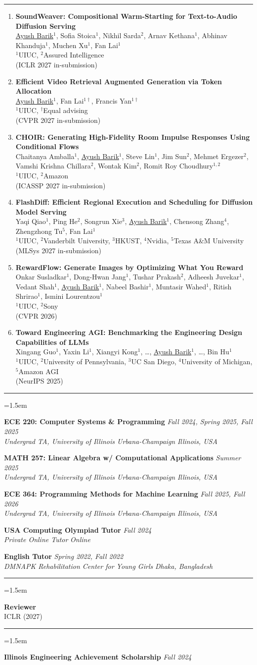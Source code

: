 \documentclass[11pt,letterpaper]{article}
\newcommand{\rsection}[1]{\vspace{7pt}{\bfseries\scshape #1}\par\vspace{-6pt}\rule{\linewidth}{0.6pt}\par\vspace{2pt}}
\newenvironment{rblock}{\begin{list}{}{\leftmargin=1.5em\itemsep=8pt\topsep=2pt}}{\end{list}}
\newcommand{\entry}[4]{\item \textbf{#1} \hfill \textit{#2}\\ \textit{#3} \hfill \textit{#4}}
\newcommand{\me}{\uline{Ayush Barik}}
\newcommand{\pub}[4]{\item \textbf{#1}\\ #2\\ #3\\ #4}
\begin{document}
\rsection{Research}
\begin{enumerate}[leftmargin=1.5em,itemsep=4pt,topsep=3pt]
\pub{SoundWeaver: Compositional Warm-Starting for Text-to-Audio Diffusion Serving}
  {\me$^1$, Sofia Stoica$^1$, Nikhil Sarda$^2$, Arnav Kethana$^1$, Abhinav Khanduja$^1$, Muchen Xu$^1$, Fan Lai$^1$}
  {$^1$UIUC, $^2$Assured Intelligence}{(ICLR 2027 in-submission)}
\pub{Efficient Video Retrieval Augmented Generation via Token Allocation}
  {\me$^1$, Fan Lai$^{1\dagger}$, Francis Yan$^{1\dagger}$}{$^1$UIUC, $^\dagger$Equal advising}{(CVPR 2027 in-submission)}
\pub{CHOIR: Generating High-Fidelity Room Impulse Responses Using Conditional Flows}
  {Chaitanya Amballa$^1$, \me$^1$, Steve Lin$^1$, Jim Sun$^2$, Mehmet Ergezer$^2$, Vamshi Krishna Chillara$^2$, Wontak Kim$^2$, Romit Roy Choudhury$^{1,2}$}
  {$^1$UIUC, $^2$Amazon}{(ICASSP 2027 in-submission)}
\pub{FlashDiff: Efficient Regional Execution and Scheduling for Diffusion Model Serving}
  {Yaqi Qiao$^1$, Ping He$^2$, Songrun Xie$^3$, \me$^1$, Chensong Zhang$^4$, Zhengzhong Tu$^5$, Fan Lai$^1$}
  {$^1$UIUC, $^2$Vanderbilt University, $^3$HKUST, $^4$Nvidia, $^5$Texas A\&M University}{(MLSys 2027 in-submission)}
\pub{RewardFlow: Generate Images by Optimizing What You Reward}
  {Onkar Susladkar$^1$, Dong-Hwan Jang$^1$, Tushar Prakash$^2$, Adheesh Juvekar$^1$, Vedant Shah$^1$, \me$^1$, Nabeel Bashir$^1$, Muntasir Wahed$^1$, Ritish Shrirao$^1$, Ismini Lourentzou$^1$}
  {$^1$UIUC, $^2$Sony}{(CVPR 2026)}
\pub{Toward Engineering AGI: Benchmarking the Engineering Design Capabilities of LLMs}
  {Xingang Guo$^1$, Yaxin Li$^1$, Xiangyi Kong$^1$, \dots, \me$^1$, \dots, Bin Hu$^1$}
  {$^1$UIUC, $^2$University of Pennsylvania, $^3$UC San Diego, $^4$University of Michigan, $^5$Amazon AGI}{(NeurIPS 2025)}
\end{enumerate}

\newpage
\rsection{Teaching}
\begin{rblock}
  \entry{ECE 220: Computer Systems \& Programming}{Fall 2024, Spring 2025, Fall 2025}{Undergrad TA, University of Illinois Urbana-Champaign}{Illinois, USA}
  \entry{MATH 257: Linear Algebra w/ Computational Applications}{Summer 2025}{Undergrad TA, University of Illinois Urbana-Champaign}{Illinois, USA}
  \entry{ECE 364: Programming Methods for Machine Learning}{Fall 2025, Fall 2026}{Undergrad TA, University of Illinois Urbana-Champaign}{Illinois, USA}
  \entry{USA Computing Olympiad Tutor}{Fall 2024}{Private Online Tutor}{Online}
  \entry{English Tutor}{Spring 2022, Fall 2022}{DMNAPK Rehabilitation Center for Young Girls}{Dhaka, Bangladesh}
\end{rblock}

\rsection{Service}
\begin{rblock}
  \item \textbf{Reviewer}\\ ICLR (2027)
\end{rblock}

\rsection{Awards}
\begin{rblock}
  \item \textbf{Illinois Engineering Achievement Scholarship} \hfill \textit{Fall 2024}
\end{rblock}
\end{document}
